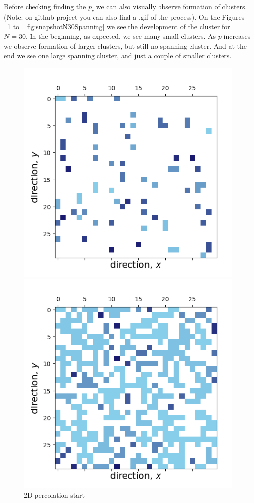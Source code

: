 \documentclass[12pt]{article}
\begin{document}
Before checking finding the $p_c$ we can also visually observe formation of clusters. (Note: on github project you can also find a .gif of the process). On the Figures ~\ref{fig:snapshotN30One} to ~\ref{fig:snapshotN30Spanning} we see the development of the cluster for $N=30$. In the beginning, as expected, we see many small clusters. As $p$ increases we observe formation of larger clusters, but still no spanning cluster. And at the end we see one large spanning cluster, and just a couple of smaller clusters.

\begin{figure}[!htb]
  \includegraphics[width=\linewidth]{snapshotN30One.png}
  \caption{2D percolation start}\label{fig:snapshotN30One}
\endminipage\hfill
{}
  \includegraphics[width=\linewidth]{snapshotN30Two.png}

\end{figure}
\end{document}

